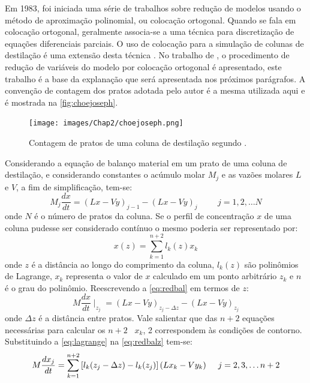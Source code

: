 Em 1983, foi iniciada uma série de trabalhos sobre redução de modelos usando o método de aproximação polinomial, ou
colocação ortogonal. Quando se fala em colocação ortogonal, geralmente associa-se a uma técnica para
discretização de equações diferenciais parciais. O uso de colocação para a simulação de colunas de
destilação é uma extensão desta técnica \cite{Huss:1996}.
No trabalho de , o procedimento de redução
de variáveis do modelo por colocação ortogonal é apresentado, este trabalho é
a base da explanação que será apresentada nos próximos parágrafos. A convenção de contagem dos pratos
adotada pelo autor é a mesma utilizada aqui e é mostrada na \autoref{fig:choejoseph}.
 \begin{figure}[htb]
 \centering \texttt{[image: images/Chap2/choejoseph.png]}
 \caption{Contagem de pratos de uma coluna de destilação segundo .}
 \label{fig:choejoseph}
 \end{figure}

Considerando a equação de balanço material em um prato de uma coluna de destilação, e considerando constantes
o acúmulo molar $M_j$ e as vazões molares $L$ e $V$, a fim de simplificação, tem-se:
\begin{equation}
M_j \dfrac{dx}{dt}=(Lx-Vy)_{j-1} - (Lx-Vy)_j \hspace{1cm} j=1,2,\ldots N
\label{eq:redbal}
\end{equation}
onde $N$ é o número de pratos da coluna. Se o perfil de concentração $x$ de uma coluna pudesse ser considerado contínuo
o mesmo poderia ser representado por:
\begin{equation}
x(z)=\sum^{n+2}_{k=1}l_k(z)x_k
\label{eq:lagrange}
\end{equation}
onde $z$ é a distância ao longo do comprimento da coluna, $l_k(z)$ são polinômios de Lagrange, $x_k$ representa o
valor de $x$ calculado em um ponto arbitrário $z_k$ e $n$ é o grau do polinômio. Reescrevendo a \autoref{eq:redbal} em termos de $z$:
\begin{equation}
M  \dfrac{dx}{dt} \mid_{z_j}=(Lx-Vy)_{z_j-\Delta z} - (Lx-Vy)_{z_j}
\label{eq:redbalz}
\end{equation}
onde $\Delta z$ é a distância entre pratos. Vale salientar que das $n+2$ equações necessárias para calcular os
$n+2$ \ $x_k$, 2 correspondem às condições de
contorno. Substituindo a \autoref{eq:lagrange} na \autoref{eq:redbalz} tem-se:
\begin{equation}
M\dfrac{dx_j}{dt}=\sum^{n+2}_{k=1} \left[ l_k(z_j-\Delta z) - l_k(z_j)\right](Lx_k-Vy_k)  \hspace{0.5cm} j=2,3,\ldots n+2
\label{eq:redbal3}
\end{equation}

